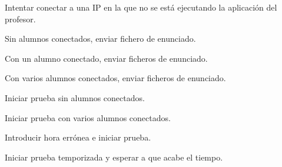 Intentar conectar a una IP en la que no se está ejecutando la aplicación del profesor.

Sin alumnos conectados, enviar fichero de enunciado.

Con un alumno conectado, enviar ficheros de enunciado.

Con varios alumnos conectados, enviar ficheros de enunciado.


Iniciar prueba sin alumnos conectados.

Iniciar prueba con varios alumnos conectados.


Introducir hora errónea e iniciar prueba.

Iniciar prueba temporizada y esperar a que acabe el tiempo.

